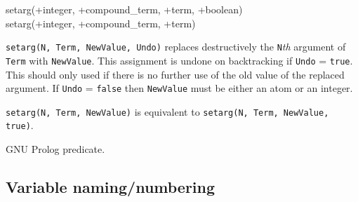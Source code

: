 \begin{TemplatesOneCol}
setarg(+integer, +compound\_term, +term, +boolean)\\
setarg(+integer, +compound\_term, +term)

\end{TemplatesOneCol}

\Description

\texttt{setarg(N, Term, NewValue, Undo)} replaces destructively the
\texttt{N}\emph{th} argument of \texttt{Term} with \texttt{NewValue}. This
assignment is undone on backtracking if \texttt{Undo} = \texttt{true}. This
should only used if there is no further use of the old value of the replaced
argument. If \texttt{Undo} = \texttt{false} then \texttt{NewValue} must be
either an atom or an integer.

\texttt{setarg(N, Term, NewValue)} is equivalent to \texttt{setarg(N, Term,
NewValue, true)}.

\begin{PlErrors}









\end{PlErrors}

\Portability

GNU Prolog predicate.

\subsection{Variable naming/numbering}
\label{Variable-naming/numbering}

